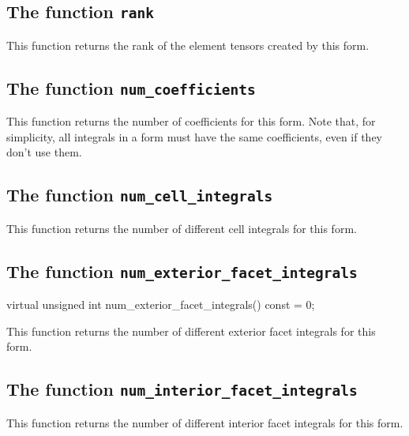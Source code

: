 \subsection{The function \texttt{rank}}
This function returns the rank of the element tensors created by this form.



\subsection{The function \texttt{num\_coefficients}}
This function returns the number of coefficients for this form.
Note that, for simplicity, all integrals in a form must have
the same coefficients, even if they don't use them.



\subsection{The function \texttt{num\_cell\_integrals}}
This function returns the number of different cell integrals for this form.


\subsection{The function \texttt{num\_exterior\_facet\_integrals}}
\begin{code}
virtual unsigned int num_exterior_facet_integrals() const = 0;
\end{code}
This function returns the number of different exterior facet integrals for this form.



\subsection{The function \texttt{num\_interior\_facet\_integrals}}
This function returns the number of different interior facet integrals for this form.



